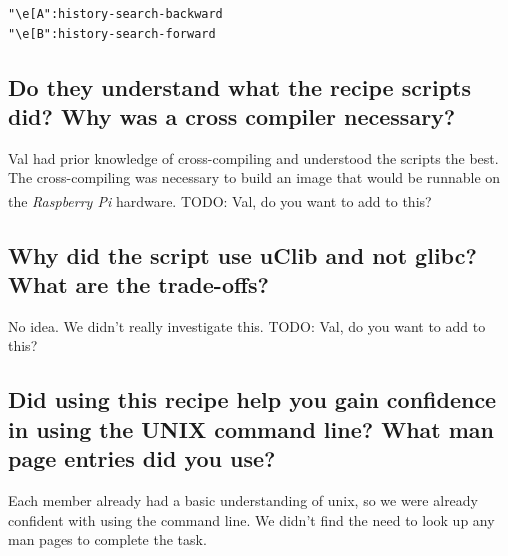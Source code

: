 \documentclass[11pt,a4paper,titlepage]{report}
\newcommand{\rpi}{\textit{Raspberry Pi\textsuperscript{\textregistered}}}
\begin{document}
\begin{appendices}
\begin{lstlisting}[frame=single]
"\e[A":history-search-backward
"\e[B":history-search-forward
\end{lstlisting}

\subsection*{Do they understand what the recipe scripts did? Why was a cross compiler 
necessary?}

Val had prior knowledge of cross-compiling and understood the scripts the best. The cross-compiling was necessary to build an image that would be runnable on the \rpi\xspace hardware. {\color{red} TODO: Val, do you want to add to this? }

\subsection*{Why did the script use uClib and not glibc? What are the trade-offs?}

No idea. We didn't really investigate this. {\color{red} TODO: Val, do you want to add to this? }

\subsection*{Did using this recipe help you gain confidence in using the UNIX command 
line? What man page entries did you use? }

Each member already had a basic understanding of unix, so we were already confident with using the command line. We didn't find the need to look up any man pages to complete the task. 

\end{appendices}


\nocite{*}
\printbibliography[heading=bibintoc]
\end{document}
